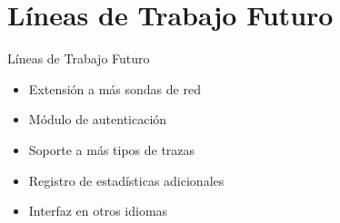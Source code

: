 \section{Líneas de Trabajo Futuro}

\begin{frame}{Líneas de Trabajo Futuro}
  \begin{itemize}[<alert@+>]
    \item Extensión a más sondas de red
    \item Módulo de autenticación
    \item Soporte a más tipos de trazas
    \item Registro de estadísticas adicionales
    \item Interfaz en otros idiomas
  \end{itemize}
\end{frame}
